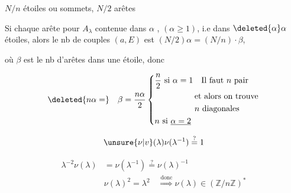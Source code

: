 
$N/n$ étoiles ou sommets, $N/2$ arêtes

Si chaque arête pour $A_\lambda$ contenue dans $\alpha$ ,  $(\alpha\geq1)$, i.e dans $\deleted{\alpha}\alpha$ étoiles, alors le nb de couples $(a,E)$ est $(N/2)\alpha=(N/n)\cdot\beta$,

où $\beta$ est le nb d'arêtes dans une étoile, donc

\[
\deleted{n\alpha=}\quad \beta=\frac{n\alpha}{2}\left\{\begin{aligned}
&\frac n2\ \text{si }\alpha=1\quad\text{Il faut }n\text{ pair}\\
&\hspace{1.7cm}\text{et alors on trouve}\\
&\hspace{1.7cm}n\ \text{diagonales}\\
&n\ \text{si }\underline{\alpha=2}
\end{aligned}\right.
\]


\[
\unsure{\nu|v}(\lambda)\nu(\lambda^{-1})\overset{?}{=}1
\]

\[
\begin{aligned}
\lambda^{-2}\nu(\lambda)&=\nu(\lambda^{-1})\overset{?}{=}\nu(\lambda)^{-1}\\
&\nu(\lambda)^2=\lambda^2\quad\overset{\text{donc}}{\Longrightarrow}\boxed{\nu(\lambda)\in(\mathbb Z/n\mathbb Z)^*}
\end{aligned}
\]

